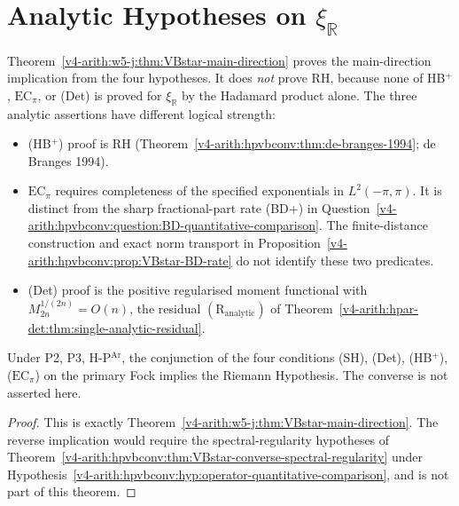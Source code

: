 \section{Analytic Hypotheses on \(\xi_{\mathbb R}\)}
\label{v4-arith:w5-j:what-remains}

\begin{remark}
\label{v4-arith:w5-j:rem:open-core}
Theorem~\ref{v4-arith:w5-j:thm:VBstar-main-direction} proves the main-direction
implication from the four hypotheses. It does \emph{not} prove RH, because
none of HB\(^{+}\), \(\mathrm{EC}_\pi\), or (Det) is proved for \(\xi_{\mathbb
R}\) by the Hadamard product alone. The three analytic assertions have
different logical strength:
\begin{itemize}
\item (HB\(^{+}\)) proof is RH
(Theorem~\ref{v4-arith:hpvbconv:thm:de-branges-1994}; de Branges
1994).
\item \(\mathrm{EC}_\pi\) requires completeness of the specified
exponentials in \(L^2(-\pi,\pi)\). It is distinct from the sharp
fractional-part rate (BD+) in
Question~\ref{v4-arith:hpvbconv:question:BD-quantitative-comparison}.
The finite-distance construction and exact norm transport in
Proposition~\ref{v4-arith:hpvbconv:prop:VBstar-BD-rate} do not identify
these two predicates.
\item (Det) proof is the positive regularised moment
functional with \(M_{2n}^{1/(2n)}=O(n)\), the residual
\((\mathrm{R}_{\mathrm{analytic}})\) of
Theorem~\ref{v4-arith:hpar-det:thm:single-analytic-residual}.
\end{itemize}
\end{remark}

\begin{theorem}
\label{v4-arith:w5-j:thm:residual-form}
Under P2, P3, H-P\(^{\mathrm{Ar}}\), the
conjunction of the four conditions (SH), (Det), (HB\(^{+}\)), (\(\mathrm{EC}_\pi\))
on the primary Fock implies the Riemann Hypothesis. The converse is not
asserted here.
\end{theorem}

\begin{proof}
This is exactly
Theorem~\ref{v4-arith:w5-j:thm:VBstar-main-direction}. The reverse implication
would require the spectral-regularity hypotheses of
Theorem~\ref{v4-arith:hpvbconv:thm:VBstar-converse-spectral-regularity} under Hypothesis~\ref{v4-arith:hpvbconv:hyp:operator-quantitative-comparison}, and
is not part of this theorem.
\end{proof}


